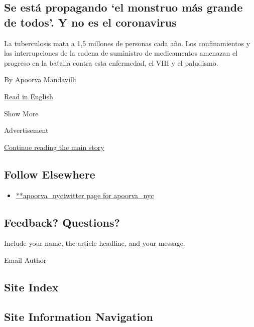 \begin{enumerate}
  \hypertarget{se-estuxe1-propagando-el-monstruo-muxe1s-grande-de-todos-y-no-es-el-coronavirus}{%
  \subsection{Se está propagando `el monstruo más grande de todos'. Y no
  es el
  coronavirus}\label{se-estuxe1-propagando-el-monstruo-muxe1s-grande-de-todos-y-no-es-el-coronavirus}}

  La tuberculosis mata a 1,5 millones de personas cada año. Los
  confinamientos y las interrupciones de la cadena de suministro de
  medicamentos amenazan el progreso en la batalla contra esta
  enfermedad, el VIH y el paludismo.

  By Apoorva Mandavilli

  \href{https://www.nytimes3xbfgragh.onion/2020/08/03/health/coronavirus-tuberculosis-aids-malaria.html}{Read
  in English}
\end{enumerate}

Show More

Advertisement

\protect\hyperlink{after-mid2}{Continue reading the main story}

\hypertarget{follow-elsewhere}{%
\subsection{Follow Elsewhere}\label{follow-elsewhere}}

\begin{itemize}
\tightlist
\item
  \href{https://twitter.com/apoorva_nyc}{**apoorva\_nyctwitter page for
  apoorva\_nyc}
\end{itemize}

\hypertarget{feedback-questions}{%
\subsection{Feedback? Questions?}\label{feedback-questions}}

Include your name, the article headline, and your message.

Email Author

\hypertarget{site-index}{%
\subsection{Site Index}\label{site-index}}

\hypertarget{site-information-navigation}{%
\subsection{Site Information
Navigation}\label{site-information-navigation}}

